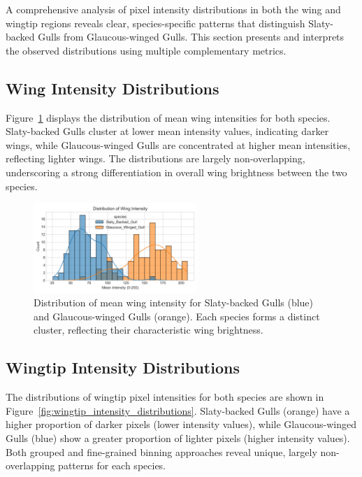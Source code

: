 \documentclass[a4paper,12pt]{report}
\begin{document}
A comprehensive analysis of pixel intensity distributions in both the wing and wingtip regions reveals clear, species-specific patterns that distinguish Slaty-backed Gulls from Glaucous-winged Gulls. This section presents and interprets the observed distributions using multiple complementary metrics.

\subsection{Wing Intensity Distributions}

Figure~\ref{fig:wing_intensity_distribution} displays the distribution of mean wing intensities for both species. Slaty-backed Gulls cluster at lower mean intensity values, indicating darker wings, while Glaucous-winged Gulls are concentrated at higher mean intensities, reflecting lighter wings. The distributions are largely non-overlapping, underscoring a strong differentiation in overall wing brightness between the two species.

\begin{figure}[H]
    \centering
    \includegraphics[width=0.55\textwidth]{images/REPORT_IMAGES_INTENSITY/I2/distribution.png}
    \caption{Distribution of mean wing intensity for Slaty-backed Gulls (blue) and Glaucous-winged Gulls (orange). Each species forms a distinct cluster, reflecting their characteristic wing brightness.}
    \label{fig:wing_intensity_distribution}
\end{figure}


\subsection{Wingtip Intensity Distributions}

The distributions of wingtip pixel intensities for both species are shown in Figure~\ref{fig:wingtip_intensity_distributions}. Slaty-backed Gulls (orange) have a higher proportion of darker pixels (lower intensity values), while Glaucous-winged Gulls (blue) show a greater proportion of lighter pixels (higher intensity values). Both grouped and fine-grained binning approaches reveal unique, largely non-overlapping patterns for each species.
\end{document}
